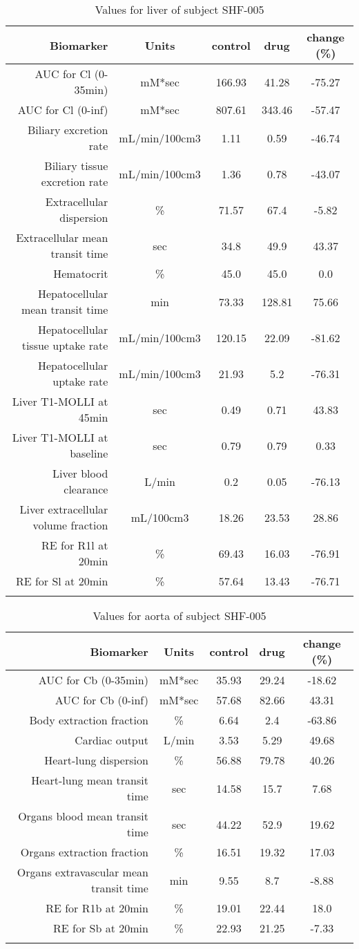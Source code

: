 \documentclass{epflreport}%
\begin{document}
%
\clearpage%
\begin{longtable}{rcccc}%
\hline%
Biomarker&Units&control&drug&change (\%)\\%
\hline%
AUC for Cl (0{-}35min)&mM*sec&166.93&41.28&{-}75.27\\%
AUC for Cl (0{-}inf)&mM*sec&807.61&343.46&{-}57.47\\%
Biliary excretion rate&mL/min/100cm3&1.11&0.59&{-}46.74\\%
Biliary tissue excretion rate&mL/min/100cm3&1.36&0.78&{-}43.07\\%
Extracellular dispersion&\%&71.57&67.4&{-}5.82\\%
Extracellular mean transit time&sec&34.8&49.9&43.37\\%
Hematocrit&\%&45.0&45.0&0.0\\%
Hepatocellular mean transit time&min&73.33&128.81&75.66\\%
Hepatocellular tissue uptake rate&mL/min/100cm3&120.15&22.09&{-}81.62\\%
Hepatocellular uptake rate&mL/min/100cm3&21.93&5.2&{-}76.31\\%
Liver T1{-}MOLLI at 45min&sec&0.49&0.71&43.83\\%
Liver T1{-}MOLLI at baseline&sec&0.79&0.79&0.33\\%
Liver blood clearance&L/min&0.2&0.05&{-}76.13\\%
Liver extracellular volume fraction&mL/100cm3&18.26&23.53&28.86\\%
RE for R1l at 20min&\%&69.43&16.03&{-}76.91\\%
RE for Sl at 20min&\%&57.64&13.43&{-}76.71\\%
\hline%
\caption{Values for liver of subject SHF-005} \\%
\end{longtable}%
\begin{longtable}{rcccc}%
\hline%
Biomarker&Units&control&drug&change (\%)\\%
\hline%
AUC for Cb (0{-}35min)&mM*sec&35.93&29.24&{-}18.62\\%
AUC for Cb (0{-}inf)&mM*sec&57.68&82.66&43.31\\%
Body extraction fraction&\%&6.64&2.4&{-}63.86\\%
Cardiac output&L/min&3.53&5.29&49.68\\%
Heart{-}lung dispersion&\%&56.88&79.78&40.26\\%
Heart{-}lung mean transit time&sec&14.58&15.7&7.68\\%
Organs blood mean transit time&sec&44.22&52.9&19.62\\%
Organs extraction fraction&\%&16.51&19.32&17.03\\%
Organs extravascular mean transit time&min&9.55&8.7&{-}8.88\\%
RE for R1b at 20min&\%&19.01&22.44&18.0\\%
RE for Sb at 20min&\%&22.93&21.25&{-}7.33\\%
\hline%
\caption{Values for aorta of subject SHF-005} \\%
\end{longtable}%
\clearpage%
\end{document}

